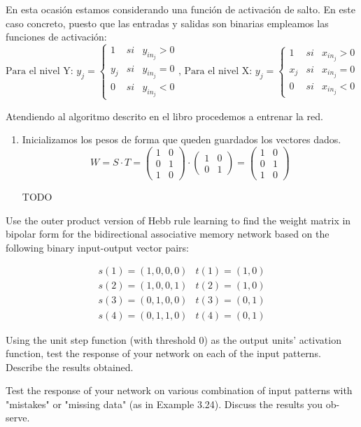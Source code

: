 \begin{problem}[10]
\spart En esta ocasión estamos considerando una función de activación de salto. En este caso concreto, puesto que las entradas y salidas son binarias empleamos las funciones de activación:
\[\text{Para el nivel Y: } y_j = \left\{ \begin{array}{lll}
1   & si & y_{in_j} > 0 \\
y_j & si & y_{in_j} = 0 \\
0   & si & y_{in_j} < 0
\end{array}\right. \text{,   Para el nivel X: } y_j = \left\{ \begin{array}{lll}
1   & si & x_{in_j} > 0 \\
x_j & si & x_{in_j} = 0 \\
0   & si & x_{in_j} < 0
\end{array}\right.\]

Atendiendo al algoritmo descrito en el libro procedemos a entrenar la red.
\begin{enumerate}
\item Inicializamos los pesos de forma que queden guardados los vectores dados.
\[W = S\cdot T = \left( \begin{array}{cc} 1 & 0 \\ 0 & 1 \\ 1 & 0 \end{array}\right)\cdot \left( \begin{array}{cc} 1 & 0 \\ 0 & 1\end{array} \right) = \left(\begin{array}{ccc}
1 & 0 \\
0 & 1 \\
1 & 0 \end{array} \right)\]

TODO
\end{enumerate}
\end{problem}

\begin{problem}[11]
\ppart Use the outer product version of Hebb rule learning to find the weight matrix in bipolar form for the bidirectional associative memory network based on the following binary input-output vector pairs:

\[\begin{array}{ll}
s(1)=(1,0,0,0) & t(1)=(1,0)\\
s(2)=(1,0,0,1) & t(2)=(1,0)\\
s(3)=(0,1,0,0) & t(3)=(0,1)\\
s(4)=(0,1,1,0) & t(4)=(0,1)
\end{array}\]

\ppart Using the unit step function (with threshold 0) as the output units' activation function, test the response of your network on each of the input patterns. Describe the results obtained.

\ppart Test the response of your network on various combination of input patterns with "mistakes" or "missing data" (as in Example 3.24). Discuss the results you ob-
serve.

\solution
\end{problem}